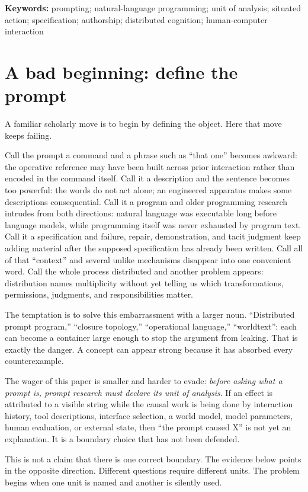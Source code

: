 \documentclass[11pt]{article}
\begin{document}
\textbf{Keywords:} prompting; natural-language programming; unit of analysis; situated action; specification; authorship; distributed cognition; human-computer interaction

\section{A bad beginning: define the prompt}
A familiar scholarly move is to begin by defining the object. Here that move keeps failing.

Call the prompt a command and a phrase such as “that one” becomes awkward: the operative reference may have been built across prior interaction rather than encoded in the command itself. Call it a description and the sentence becomes too powerful: the words do not act alone; an engineered apparatus makes some descriptions consequential. Call it a program and older programming research intrudes from both directions: natural language was executable long before language models, while programming itself was never exhausted by program text. Call it a specification and failure, repair, demonstration, and tacit judgment keep adding material after the supposed specification has already been written. Call all of that “context” and several unlike mechanisms disappear into one convenient word. Call the whole process distributed and another problem appears: distribution names multiplicity without yet telling us which transformations, permissions, judgments, and responsibilities matter.

The temptation is to solve this embarrassment with a larger noun. “Distributed prompt program,” “closure topology,” “operational language,” “worldtext”: each can become a container large enough to stop the argument from leaking. That is exactly the danger. A concept can appear strong because it has absorbed every counterexample.

The wager of this paper is smaller and harder to evade: \emph{before asking what a prompt is, prompt research must declare its unit of analysis}. If an effect is attributed to a visible string while the causal work is being done by interaction history, tool descriptions, interface selection, a world model, model parameters, human evaluation, or external state, then “the prompt caused X” is not yet an explanation. It is a boundary choice that has not been defended.

This is not a claim that there is one correct boundary. The evidence below points in the opposite direction. Different questions require different units. The problem begins when one unit is named and another is silently used.
\end{document}
